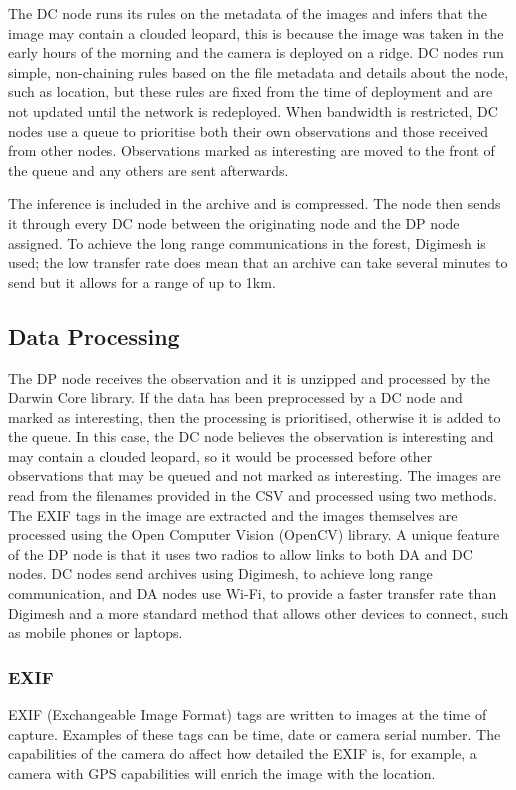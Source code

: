 			The DC node runs its rules on the metadata of the images and infers that the image may contain a clouded leopard, this is because the image was taken in the early hours of the morning and the camera is deployed on a ridge. DC nodes run simple, non-chaining rules based on the file metadata and details about the node, such as location, but these rules are fixed from the time of deployment and are not updated until the network is redeployed. When bandwidth is restricted, DC nodes use a queue to prioritise both their own observations and those received from other nodes. Observations marked as interesting are moved to the front of the queue and any others are sent afterwards.
			
			The inference is included in the archive and is compressed. The node then sends it through every DC node between the originating node and the DP node assigned. To achieve the long range communications in the forest, Digimesh is used; the low transfer rate does mean that an archive can take several minutes to send but it allows for a range of up to 1km.

	\subsection{Data Processing}			
			The DP node receives the observation and it is unzipped and processed by the Darwin Core library. If the data has been preprocessed by a DC node and marked as interesting, then the processing is prioritised, otherwise it is added to the queue. In this case, the DC node believes the observation is interesting and may contain a clouded leopard, so it would be processed before other observations that may be queued and not marked as interesting. The images are read from the filenames provided in the CSV and processed using two methods. The EXIF tags in the image are extracted and the images themselves are processed using the Open Computer Vision (OpenCV) library. A unique feature of the DP node is that it uses two radios to allow links to both DA and DC nodes. DC nodes send archives using Digimesh, to achieve long range communication, and DA nodes use Wi-Fi, to provide a faster transfer rate than Digimesh and a more standard method that allows other devices to connect, such as mobile phones or laptops.
			
		\subsubsection{EXIF}
			EXIF (Exchangeable Image Format) tags are written to images at the time of capture. Examples of these tags can be time, date or camera serial number. The capabilities of the camera do affect how detailed the EXIF is, for example, a camera with GPS capabilities will enrich the image with the location. 
			
